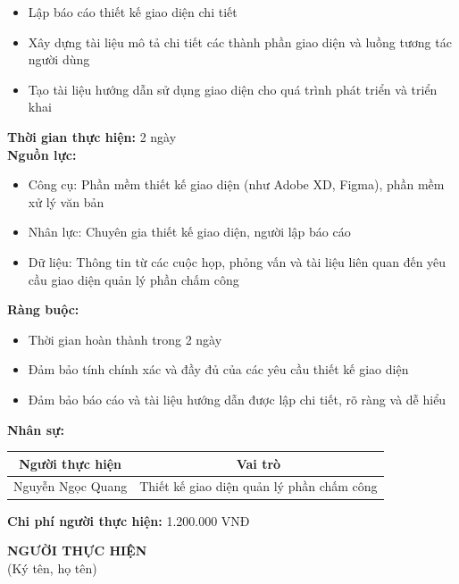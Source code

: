{\begin{minipage}{\textwidth}
\begin{itemize}
        \item Lập báo cáo thiết kế giao diện chi tiết
        \item Xây dựng tài liệu mô tả chi tiết các thành phần giao diện và luồng tương tác người dùng
        \item Tạo tài liệu hướng dẫn sử dụng giao diện cho quá trình phát triển và triển khai
    \end{itemize}
    \vspace{0.5cm}
    \noindent \textbf{Thời gian thực hiện:} 2 ngày \\
    \noindent \textbf{Nguồn lực:}
    \begin{itemize}
        \item Công cụ: Phần mềm thiết kế giao diện (như Adobe XD, Figma), phần mềm xử lý văn bản
        \item Nhân lực: Chuyên gia thiết kế giao diện, người lập báo cáo
        \item Dữ liệu: Thông tin từ các cuộc họp, phỏng vấn và tài liệu liên quan đến yêu cầu giao diện quản lý phần chấm công
    \end{itemize}
    \vspace{0.5cm}
    \noindent \textbf{Ràng buộc:}
    \begin{itemize}
        \item Thời gian hoàn thành trong 2 ngày
        \item Đảm bảo tính chính xác và đầy đủ của các yêu cầu thiết kế giao diện
        \item Đảm bảo báo cáo và tài liệu hướng dẫn được lập chi tiết, rõ ràng và dễ hiểu
    \end{itemize}
    \vspace{0.5cm}
    \noindent \textbf{Nhân sự:}
    \begin{longtable}{|c|c|}
    \hline
    \textbf{Người thực hiện} & \textbf{Vai trò} \\
    \hline
    Nguyễn Ngọc Quang & Thiết kế giao diện quản lý phần chấm công \\
    \hline
    \end{longtable}
    \vspace{0.5cm}
    \noindent \textbf{Chi phí người thực hiện:} 1.200.000 VNĐ
    \vspace{1cm}
    \begin{flushleft}
        \hspace{8cm} \textbf{NGƯỜI THỰC HIỆN} \\
        \hspace{8.8cm} (Ký tên, họ tên) \\
        \vspace{1cm}
    \end{flushleft}
    \end{minipage}
}
% 
